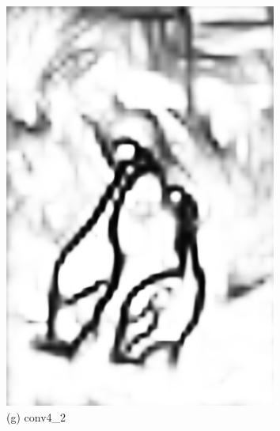 \documentclass[CJK,aspectratio=169]{beamer}  %
\begin{document}
\begin{frame}
\begin{figure}
\begin{minipage}{0.11\columnwidth}
				\includegraphics[width=\linewidth]{picture/LLIE/RCF/conv4_2}
				\caption*{\tiny (g) conv4\_2}
				\label{fig: conv4_2}	
			\end{minipage}
			\begin{minipage}{0.11\columnwidth}

\end{minipage}
\end{figure}
\end{frame}
\end{document}
